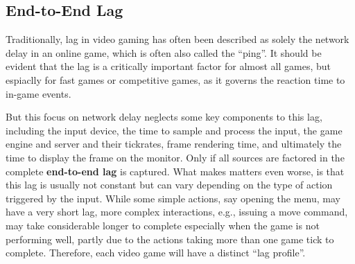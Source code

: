 



\subsection{End-to-End Lag}\label{subsec:e2e-lag}

Traditionally, lag in video gaming has often been described as solely the network delay in an online game, which is often also called the ``ping''. It should be evident that the lag is a critically important factor for almost all games, but espiaclly for fast games or competitive games, as it governs the reaction time to in-game events.

But this focus on network delay neglects some key components to this lag, including the input device, the time to sample and process the input, the game engine and server and their tickrates, frame rendering time, and ultimately the time to display the frame on the monitor. Only if all sources are factored in the complete \textbf{end-to-end lag} is captured. What makes matters even worse, is that this lag is usually not constant but can vary depending on the type of action triggered by the input. While some simple actions, say opening the menu, may have a very short lag, more complex interactions, e.g., issuing a move command, may take considerable longer to complete especially when the game is not performing well, partly due to the actions taking more than one game tick to complete. Therefore, each video game will have a distinct ``lag profile''.  


